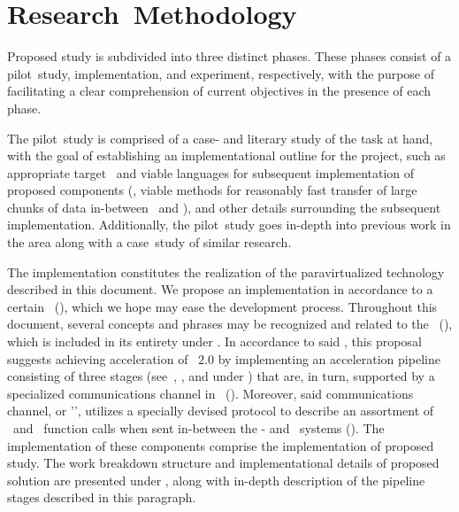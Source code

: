 
\chapter{Research~Methodology}
\label{cha:researchmethodology}
Proposed study is subdivided into three distinct phases.
These phases consist of a pilot~study, implementation, and experiment, respectively, with the purpose of facilitating a clear comprehension of current objectives in the presence of each phase.

The pilot~study is comprised of a case- and literary study of the task at hand, with the goal of establishing an implementational outline for the project, such as appropriate target \termos\ and viable languages for subsequent implementation of proposed components (\termeg , viable methods for reasonably fast transfer of large chunks of data in-between \termtarget\ and \termhost ), and other details surrounding the subsequent implementation.
Additionally, the pilot~study goes in-depth into previous work in the area along with a case~study of similar research.

The implementation constitutes the realization of the paravirtualized technology described in this document.
We propose an implementation in accordance to a certain \termrefsolu\ (), which we hope may ease the development process.
Throughout this document, several concepts and phrases may be recognized and related to the \termandroiddesignoverview\ (), which is included in its entirety under .
In accordance to said \termrefimpl , this proposal suggests achieving acceleration of \termopengles ~$2.0$ by implementing an acceleration pipeline consisting of three stages (see~, , and  under ) that are, in turn, supported by a specialized communications channel in \termsimics\ ().
Moreover, said communications channel, or '\termsimicspipe ', utilizes a specially devised protocol to describe an assortment of \termopengles\ and \termegl\ function calls when sent in-between the \termhost - and \termtarget\ systems ().
The implementation of these components comprise the implementation of proposed study.
The work breakdown structure and implementational details of proposed solution are presented under , along with in-depth description of the pipeline stages described in this paragraph.

